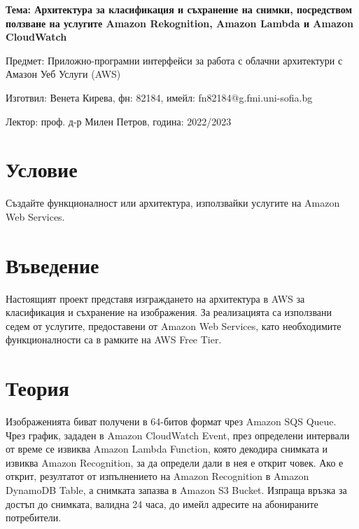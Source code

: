 \documentclass[12pt]{article}
\begin{document}
	\begin{center}
        \LARGE{\textbf{Тема: Архитектура за класификация и съхранение на снимки, посредством ползване на услугите Amazon Rekognition, Amazon Lambda и Amazon CloudWatch}}
        
        \bigskip
        \Large{Предмет: Приложно-програмни интерфейси за работа с облачни архитектури с Амазон Уеб Услуги (AWS)}
        
        \medskip
        \Large{Изготвил: Венета Кирева, фн: 82184, имейл: fn82184@g.fmi.uni-sofia.bg}
        
        \medskip
        \Large{Лектор: проф. д-р Милен Петров, година: 2022/2023}
        
        \bigskip
	\end{center}
    
    
    \tableofcontents
    \bigskip
    \bigskip
    \newpage
  
\section{Условие} 

\hspace{\parindent}Създайте функционалност или архитектура, използвайки услугите на Amazon Web Services.

\section{Въведение}

\hspace{\parindent}Настоящият проект представя изграждането на архитектура в AWS за класификация и съхранение на изображения. За реализацията са използвани седем от услугите, предоставени от Amazon Web Services, като необходимите функционалности са в рамките на AWS Free Tier.

\clearpage
\pagebreak

\section{Теория}

\hspace{\parindent} Изображенията биват получени в 64-битов формат чрез Amazon SQS Queue. Чрез график, зададен в Amazon CloudWatch Event, през определени интервали от време се извиква Amazon Lambda Function, която декодира снимката и извиква Amazon Recognition, за да определи дали в нея е открит човек. Ако е открит, резултатот от изпълнението на Amazon Recognition в Amazon DynamoDB Table, а снимката запазва в Amazon S3 Bucket. Изпраща връзка за достъп до снимката, валидна 24 часа, до имейл адресите на абонираните потребители. 
\end{document}
